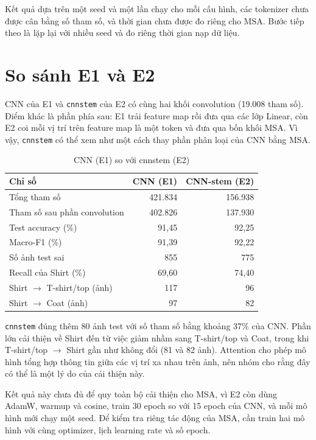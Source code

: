 \documentclass[12pt,a4paper]{article}
\begin{document}
Kết quả dựa trên một seed và một lần chạy cho mỗi cấu hình, các tokenizer
chưa được cân bằng số tham số, và thời gian chưa được đo riêng cho MSA. Bước
tiếp theo là lặp lại với nhiều seed và đo riêng thời gian nạp dữ liệu.

\clearpage
\section{So sánh E1 và E2}

CNN của E1 và \texttt{cnnstem} của E2 có cùng hai khối convolution (19.008
tham số). Điểm khác là phần phía sau: E1 trải feature map rồi đưa qua các lớp
Linear, còn E2 coi mỗi vị trí trên feature map là một token và đưa qua bốn
khối MSA. Vì vậy, \texttt{cnnstem} có thể xem như một cách thay phần phân
loại của CNN bằng MSA.

\begin{table}[H]
\centering
\caption{CNN (E1) so với cnnstem (E2)}
\begin{tabular}{lrr}
\toprule
Chỉ số & CNN (E1) & CNN-stem (E2) \\
\midrule
Tổng tham số & 421.834 & 156.938 \\
Tham số sau phần convolution & 402.826 & 137.930 \\
Test accuracy (\%) & 91,45 & 92,25 \\
Macro-F1 (\%) & 91,39 & 92,22 \\
Số ảnh test sai & 855 & 775 \\
Recall của Shirt (\%) & 69,60 & 74,40 \\
Shirt $\to$ T-shirt/top (ảnh) & 117 & 96 \\
Shirt $\to$ Coat (ảnh) & 97 & 82 \\
\bottomrule
\end{tabular}
\end{table}

\texttt{cnnstem} đúng thêm 80 ảnh test với số tham số bằng khoảng 37\% của
CNN. Phần lớn cải thiện về Shirt đến từ việc giảm nhầm sang T-shirt/top và
Coat, trong khi T-shirt/top $\to$ Shirt gần như không đổi (81 và 82 ảnh).
Attention cho phép mô hình tổng hợp thông tin giữa các vị trí xa nhau trên
ảnh, nên nhóm cho rằng đây có thể là một lý do của cải thiện này.

Kết quả này chưa đủ để quy toàn bộ cải thiện cho MSA, vì E2 còn dùng AdamW,
warmup và cosine, train 30 epoch so với 15 epoch của CNN, và mỗi mô hình mới
chạy một seed. Để kiểm tra riêng tác động của MSA, cần train hai mô hình với
cùng optimizer, lịch learning rate và số epoch.
\end{document}
